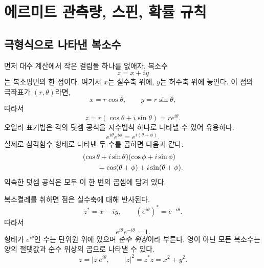 \chapter{에르미트 관측량, 스핀, 확률 규칙}


\section{극형식으로 나타낸 복소수}

먼저 대수 계산에서 작은 걸림돌 하나를 없애자. 복소수 \begin{equation}
  z=x+iy
\end{equation}는 복소평면의 한 점이다. 여기서 \(x\)는 실수축 위에, \(y\)는 허수축 위에 놓인다. 이 점의 극좌표가 \((r,\theta)\)라면, \begin{equation}
  x=r\cos\theta,
  \qquad
  y=r\sin\theta,
\end{equation} 따라서 \begin{equation}
  z=r(\cos\theta+i\sin\theta)=re^{i\theta}.
  \label{eq:l03-polar-form}
\end{equation}오일러 표기법은 각의 덧셈 공식을 지수법칙 하나로 나타낼 수 있어 유용하다. \begin{equation}
  e^{i\theta}e^{i\phi}
  =e^{i(\theta+\phi)}.
  \label{eq:l03-phase-product}
\end{equation} 실제로 삼각함수 형태로 나타낸 두 수를 곱하면 다음과 같다. \begin{align}
& (\cos\theta+i\sin\theta)(\cos\phi+i\sin\phi)
\notag\\
&\qquad=\cos(\theta+\phi)+i\sin(\theta+\phi).
\end{align}익숙한 덧셈 공식은 모두 이 한 번의 곱셈에 담겨 있다.

복소켤레를 취하면 점은 실수축에 대해 반사된다. \begin{equation}
  z^*=x-iy,
  \qquad
  (e^{i\theta})^*=e^{-i\theta}.
\end{equation}따라서 \begin{equation}
  e^{i\theta}e^{-i\theta}=1.
\end{equation}형태가 \(e^{i\theta}\)인 수는 단위원 위에 있으며 \emph{순수 위상}이라 부른다. 영이 아닌 모든 복소수는 양의 절댓값과 순수 위상의 곱으로 나타낼 수 있다. \begin{equation}
  z=|z|e^{i\theta},
  \qquad
  |z|^2=z^*z=x^2+y^2.
  \label{eq:l03-modulus-phase}
\end{equation}

